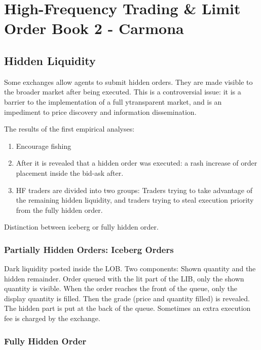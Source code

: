 \documentclass[twocolumn,openany]{book}
\begin{document}
\chapter{High-Frequency Trading \& Limit Order Book 2 - Carmona}
\section{Hidden Liquidity}
Some exchanges allow agents to submit hidden orders. They are made visible to the broader market after being executed.
This is a controversial issue: it is a barrier to the implementation of a full ytransparent market, and is an impediment to price discovery and information dissemination.

The results of the first empirical analyses:
\begin{enumerate}
	\item Encourage fishing
	\item After it is revealed that a hidden order was executed: a rash increase of order placement inside the bid-ask after.
	\item HF traders are divided into two groups: Traders trying to take advantage of the remaining hidden liquidity, and traders trying to steal execution priority from the fully hidden order.
\end{enumerate}

Distinction between iceberg or fully hidden order.

\subsection{Partially Hidden Orders: Iceberg Orders}
Dark liquidity posted inside the LOB. 
Two components: Shown quantity and the hidden remainder. 
Order queued with the lit part of the LIB, only the shown quantity is visible.
 When the order reaches the front of the queue, only the display quantity is filled.
Then the grade (price and quantity filled) is revealed.
The hidden part is put at the back of the queue. 
Sometimes an extra execution fee is charged by the exchange.

\subsection{Fully Hidden Order}
\end{document}
